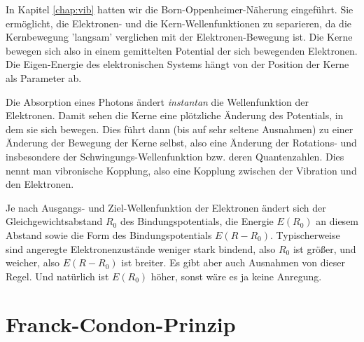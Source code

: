 In Kapitel \ref{chap:vib} hatten wir die Born-Oppenheimer-Näherung eingeführt. Sie ermöglicht, die Elektronen- und die Kern-Wellenfunktionen zu separieren, da die Kernbewegung 'langsam' verglichen mit der Elektronen-Bewegung ist. Die Kerne bewegen sich also in einem gemittelten Potential der sich bewegenden Elektronen. Die Eigen-Energie des elektronischen Systems hängt von der Position der Kerne als Parameter ab.

Die Absorption eines Photons ändert \emph{instantan} die Wellenfunktion der Elektronen. Damit sehen die Kerne eine plötzliche Änderung des Potentials, in dem sie sich bewegen. Dies führt dann (bis auf sehr seltene Ausnahmen) zu einer Änderung der Bewegung der Kerne selbst, also eine Änderung der Rotations- und insbesondere der Schwingungs-Wellenfunktion bzw. deren Quantenzahlen. Dies nennt man vibronische Kopplung, also eine Kopplung zwischen der Vibration und den Elektronen.

Je nach Ausgangs- und Ziel-Wellenfunktion der Elektronen ändert sich der Gleichgewichtsabstand $R_0$ des Bindungspotentials,  die Energie $E(R_0)$ an diesem 
Abstand sowie die Form des Bindungspotentials $E(R- R_0)$. Typischerweise  sind angeregte Elektronenzustände weniger stark bindend, also $R_0$ ist größer, und weicher, also $E(R- R_0)$ ist breiter. Es gibt aber auch Ausnahmen von dieser Regel.
Und natürlich ist $E(R_0)$ höher, sonst wäre es ja keine Anregung.

\section{Franck-Condon-Prinzip}


